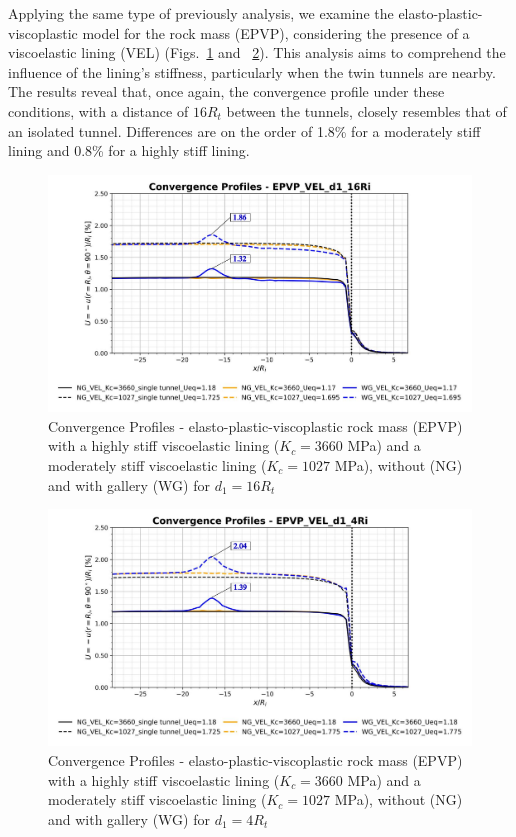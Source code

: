 \documentclass[a4paper,fleqn]{cas-sc}
\begin{document}
Applying the same type of previously analysis, we examine the elasto-plastic-viscoplastic model for the rock mass (EPVP), considering the presence of a viscoelastic lining (VEL) (Figs.~\ref{EPVP_VEL_d1_16Ri} and ~\ref{EPVP_VEL_d1_4Ri}). This analysis aims to comprehend the influence of the lining's stiffness, particularly when the twin tunnels are nearby. The results reveal that, once again, the convergence profile under these conditions, with a distance of $16R_t$ between the tunnels, closely resembles that of an isolated tunnel. Differences are on the order of 1.8\% for a moderately stiff lining and 0.8\% for a highly stiff lining.
\begin{figure}[h!]
	\centering
	\includegraphics[scale=0.5]{Convergence Profiles - EPVP_VEL_d1_16Ri.pdf}
	\caption{Convergence Profiles - elasto-plastic-viscoplastic rock mass (EPVP) with a highly stiff viscoelastic lining ($K_c = 3660$ MPa) and a moderately stiff viscoelastic lining ($K_c = 1027$ MPa), without (NG) and with gallery (WG) for $d_1 = 16R_t$}
	\label{EPVP_VEL_d1_16Ri}
\end{figure}
\FloatBarrier
\begin{figure}[h!]
	\centering
	\includegraphics[scale=0.5]{Convergence Profiles - EPVP_VEL_d1_4Ri.pdf}
	\caption{Convergence Profiles - elasto-plastic-viscoplastic rock mass (EPVP) with a highly stiff viscoelastic lining ($K_c = 3660$ MPa) and a moderately stiff viscoelastic lining ($K_c = 1027$ MPa), without (NG) and with gallery (WG) for $d_1 = 4R_t$}
	\label{EPVP_VEL_d1_4Ri}
\end{figure}
\end{document}
